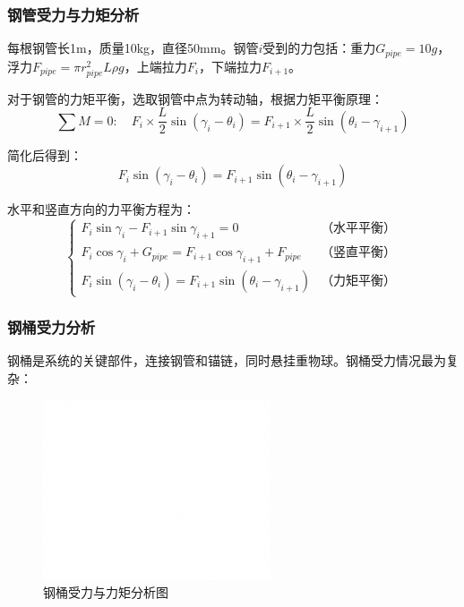 \documentclass[withoutpreface,bwprint]{cumcmthesis}
\begin{document}
\subsubsection{钢管受力与力矩分析}

每根钢管长1m，质量10kg，直径50mm。钢管$i$受到的力包括：重力$G_{pipe}=10g$，浮力$F_{pipe}=\pi r_{pipe}^2 L \rho g$，上端拉力$F_i$，下端拉力$F_{i+1}$。

对于钢管的力矩平衡，选取钢管中点为转动轴，根据力矩平衡原理：
\begin{equation}
\label{eq:钢管力矩}
\sum M = 0: \quad F_i \times \frac{L}{2}\sin(\gamma_i-\theta_i) = F_{i+1} \times \frac{L}{2}\sin(\theta_i-\gamma_{i+1})
\end{equation}

简化后得到：
\begin{equation}
F_i\sin(\gamma_i-\theta_i) = F_{i+1}\sin(\theta_i-\gamma_{i+1})
\end{equation}

水平和竖直方向的力平衡方程为：
\begin{equation}
\label{eq:钢管平衡完整}
\begin{cases}
F_i\sin\gamma_i - F_{i+1}\sin\gamma_{i+1} = 0 & \text{（水平平衡）} \\
F_i\cos\gamma_i + G_{pipe} = F_{i+1}\cos\gamma_{i+1} + F_{pipe} & \text{（竖直平衡）} \\
F_i\sin(\gamma_i-\theta_i) = F_{i+1}\sin(\theta_i-\gamma_{i+1}) & \text{（力矩平衡）}
\end{cases}
\end{equation}

\subsubsection{钢桶受力分析}

钢桶是系统的关键部件，连接钢管和锚链，同时悬挂重物球。钢桶受力情况最为复杂：

\begin{figure}[H]
\centering
\includegraphics[width=0.6\textwidth]{figures/测试图片.png}
\caption{钢桶受力与力矩分析图}
\label{fig:钢桶受力}
\end{figure}
\end{document}
